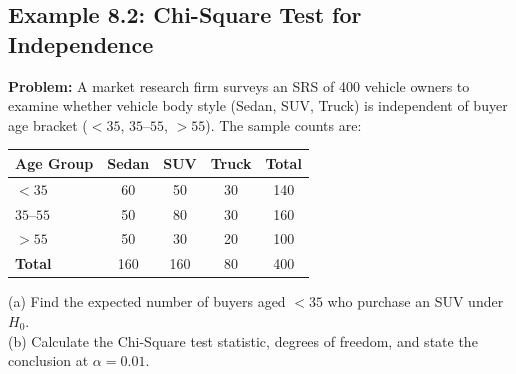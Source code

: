 \subsection*{Example 8.2: Chi-Square Test for Independence}
\textbf{Problem:} A market research firm surveys an SRS of 400 vehicle owners to examine whether vehicle body style (Sedan, SUV, Truck) is independent of buyer age bracket ($<35$, $35\text{--}55$, $>55$). The sample counts are:
\begin{center}
\begin{tabular}{lcccc}
\toprule
\textbf{Age Group} & \textbf{Sedan} & \textbf{SUV} & \textbf{Truck} & \textbf{Total} \\
\midrule
$< 35$ & 60 & 50 & 30 & 140 \\
$35\text{--}55$ & 50 & 80 & 30 & 160 \\
$> 55$ & 50 & 30 & 20 & 100 \\
\midrule
\textbf{Total} & 160 & 160 & 80 & 400 \\
\bottomrule
\end{tabular}
\end{center}
(a) Find the expected number of buyers aged $<35$ who purchase an SUV under $H_0$.\\
(b) Calculate the Chi-Square test statistic, degrees of freedom, and state the conclusion at $\alpha = 0.01$.

